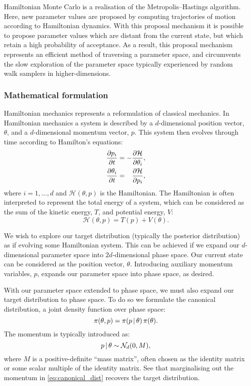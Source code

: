 Hamiltonian Monte Carlo is a realisation of the Metropolis--Hastings algorithm. Here,
new parameter values are proposed by computing trajectories of motion according to
Hamiltonian dynamics. With this proposal mechanism it is possible to propose parameter
values which are distant from the current state, but which retain a high probability of
acceptance. As a result, this proposal mechanism represents an efficient method of
traversing a parameter space, and circumvents the slow exploration of the parameter
space typically experienced by random walk samplers in higher-dimensions.

\subsubsection{Mathematical formulation}

Hamiltonian mechanics represents a reformulation of classical mechanics. In Hamiltonian
mechanics a  system is described by a $d$-dimensional position vector, $\theta$, and
a $d$-dimensional momentum vector, $p$. This system then evolves through time
according to Hamilton's equations:
\begin{align}
  \begin{split}
    \pdv{p_i}{t} &= - \pdv{\mathcal{H}}{\theta_i},\\
    \pdv{\theta_i}{t} &= \hphantom{-} \pdv{\mathcal{H}}{p_i},
  \end{split}
\end{align}
where $i=1,\ldots,d$ and $\mathcal{H}(\theta,  p)$ is the Hamiltonian. The Hamiltonian is often
interpreted to represent the total energy of a system, which can be considered as the sum
of the kinetic energy, $T$, and potential energy, $V$:
\begin{equation}
  \label{eq:hamiltonian_decomp}
  \mathcal{H}(\theta, p) = T(p) + V(\theta).
\end{equation}

We wish to explore our target distribution (typically the posterior distribution) as if
evolving some Hamiltonian system. This can be achieved if we expand our $d$-dimensional
parameter space into $2d$-dimensional phase space. Our current state can be considered as
the position vector, $\theta$. Introducing auxiliary momentum variables, $p$, expands
our parameter space into phase space, as desired.

With our parameter space extended to phase space, we must also expand our target
distribution to phase space. To do so we formulate the canonical distribution, a joint
density function over phase space:
\begin{equation}
  \label{eq:canonical_dist}
  \pi(\theta, p) = \pi(p \,|\,\theta) \, \pi(\theta).
\end{equation}
The momentum is typically introduced as:
\begin{equation}
  p \,|\, \theta \sim \mathcal{N}_d(0, M),
\end{equation}
where $M$ is a positive-definite ``mass matrix'', often chosen as the identity matrix or
some scalar multiple of the identity matrix. See that marginalising out the momentum in
\cref{eq:canonical_dist} recovers the target distribution.

